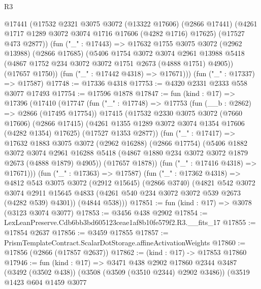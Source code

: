 \begin{lexlean}{R3}
\begin{coremodule}
        @17441
        (@17532
          @2321
          @3075
          @3072
          (@13322 @17606)
          (@2866 @17441)
          (@4261 @1717 @1289 @3072 @3074 @1716 @17606 (@4282 @1716) @17625)
          (@17527 @473 @2877))
        (fun ("_" : @17443) =>
        @17632
          @1755
          @3075
          @3072
          (@2962 @13988)
          (@2866 @17685)
          (@5406
            @1754
            @3072
            @3074
            @2961
            @13988
            @5418
            (@4867 @1752 @234 @3072 @3072 @1751 @2673 (@4888 @1751) @4905))
          (@17657 @1750))
        (fun ("_" : @17442 @4318) => @17671)))
    (fun ("_" : @17337) => @17587)
@17748 := @17336 @4318
@17753 := @4320 @2331 @2333 @558 @3077 @17493
@17754 := @17596 @1878
@17847 := fun (kind : @17) =>
  @17396
    (@17410
      (@17747
        (fun ("_" : @17748) =>
        @17753
          (fun (__b : @2862) => @2866 (@17495 @17754))
          @17415
          (@17532
            @2330
            @3075
            @3072
            (@7660 @17606)
            (@2866 @17415)
            (@4261 @1355 @1289 @3072 @3074 @1354 @17606 (@4282 @1354) @17625)
            (@17527 @1353 @2877))
          (fun ("_" : @17417) =>
          @17632
            @1883
            @3075
            @3072
            (@2962 @16288)
            (@2866 @17754)
            (@5406
              @1882
              @3072
              @3074
              @2961
              @16288
              @5418
              (@4867 @1880 @234 @3072 @3072 @1879 @2673 (@4888 @1879) @4905))
            (@17657 @1878))
          (fun ("_" : @17416 @4318) => @17671)))
      (fun ("_" : @17363) => @17587)
      (fun ("_" : @17362 @4318) =>
      @4812
        @543
        @3075
        @3072
        (@2912 @15645)
        (@2866 @3740)
        (@4821
          @542
          @3072
          @3074
          @2911
          @15645
          @4833
          (@4261 @540 @234 @3072 @3072 @539 @2673 (@4282 @539) @4301))
        (@4844 @538)))
@17851 := fun (kind : @17) => @3078 (@3123 @3074 @3077)
@17853 := @3456 @438 @2902
@17854 := LexLeanPreserve.Cdb6bb3bd605123ceae1af8b10fe579f2.R3.__fits_17
@17855 := @17854 @2637
@17856 := @3459 @17855
@17857 := PrismTemplateContract.ScalarDotStorage.affineActivationWeights
@17860 := @17856 (@2866 (@17857 @2637))
@17862 := (kind : @17) -> @17853 @17860
@17946 := fun (kind : @17) =>
  @3471
    @438
    @2902
    @17860
    @2344
    @3487
    (@3492 (@3502 @438))
    (@3508 (@3509 (@3510 @2344) @2902 @3486))
    (@3519
      @1423
      @604
      @1459
      @3077

\end{coremodule}
\end{lexlean}
